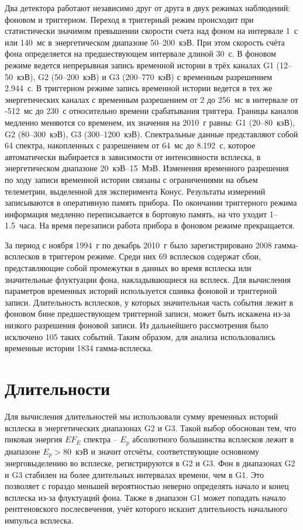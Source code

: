 Два детектора работают независимо друг от друга в двух режимах наблюдений: 
фоновом и триггерном. Переход в триггерный режим происходит при статистически 
значимом превышении скорости счета над фоном на интервале 1~с или 140~мс в 
энергетическом диапазоне 50--200~кэВ. При этом скорость счёта фона определяется 
на предшествующем интервале длиной 30~с. В фоновом режиме ведется непрерывная 
запись временной истории в трёх каналах G1 (12--50~кэВ), G2 (50--200~кэВ) и G3 (200--770~кэВ) 
с временным разрешением 2.944~с. В триггерном режиме запись временной истории ведется 
в тех же энергетических каналах с временным разрешением от 2 до 256~мс в интервале 
от -512~мс до 230~с относительно времени срабатывания триггера. Границы каналов 
медленно меняются со временем, их значения на 2010~г равны: G1 (20--80~кэВ), 
G2 (80--300~кэВ), G3 (300--1200~кэВ). Спектральные данные представляют собой 64 спектра, 
накопленных с разрешением от 64~мс до 8.192~с, которое автоматически выбирается 
в зависимости от интенсивности всплеска, в энергетическом диапазоне 20~кэВ--15~МэВ. 
Изменения временного разрешения по ходу записи временной истории связаны с 
ограничениями на объем телеметрии, выделенной для эксперимента Конус. Результаты 
измерений записываются в оперативную память прибора. По окончании триггерного 
режима информация медленно переписывается в бортовую память, на что уходит 1--1.5~часа. 
На время перезаписи работа прибора в фоновом режиме прекращается.

За период с ноября 1994~г по декабрь 2010~г было зарегистрировано 2008 гамма-всплесков 
в триггером режиме. Среди них 69 всплесков содержат сбои, представляющие собой 
промежутки в данных во время всплеска или значительные флуктуации фона, 
накладывающиеся на всплеск. Для вычисления параметров временных историй используется 
сшивка фоновой и триггерной записи. Длительность всплесков, у которых значительная 
часть события лежит в фоновом бине предшествующем триггерной записи, может быть 
искажена из-за низкого разрешения фоновой записи. Из дальнейшего рассмотрения 
было исключено 105 таких событий. Таким образом, для анализа использовались временные 
истории 1834 гамма-всплеска. 

\section{Длительности}\label{sec:Durations}
Для вычисления длительностей мы использовали сумму временных историй всплеска 
в энергетических диапазонах G2 и G3. Такой выбор обоснован тем, что  пиковая 
энергия $E F_{E}$ спектра -- $E_p$ абсолютного большинства всплесков лежит в 
диапазоне $E_p>80$~кэВ и значит отсчёты, соответствующие  основному энерговыделению 
во всплеске, регистрируются в G2 и G3. Фон в диапазонах G2 и G3 стабилен на более 
длительных интервалах времени, чем в G1. Это позволяет с гораздо меньшей вероятностью 
неверно определять начало и конец всплеска из-за флуктуаций фона. Также в диапазон G1 
может попадать начало рентгеновского послесвечения, учёт которого исказит 
длительность начального импульса всплеска.

